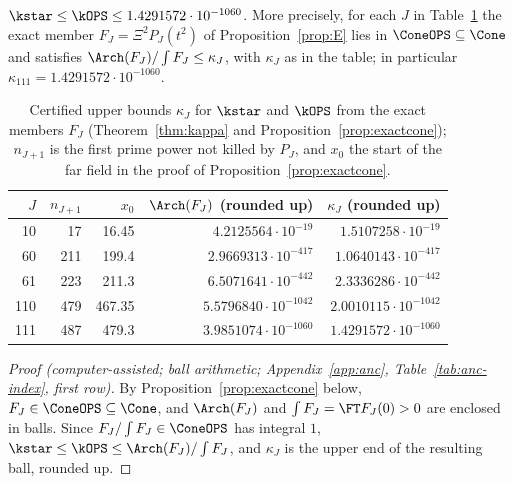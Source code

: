 \begin{theorem}\label{thm:kappa}
$\kstar\le\kOPS\le1.4291572\cdot10^{-1060}$. More precisely, for each $J$ in Table~\ref{tab:kappa-ladder} the exact member
$F_J=\Xi^2P_J(t^2)$ of Proposition~\ref{prop:E} lies in $\ConeOPS\subseteq\Cone$ and satisfies $\Arch(F_J)/\int F_J\le\kappa_J$, with
$\kappa_J$ as in the table; in particular $\kappa_{111}=1.4291572\cdot10^{-1060}$.
\end{theorem}

\begin{table}[ht]
\centering
\caption{Certified upper bounds $\kappa_J$ for $\kstar$ and $\kOPS$ from the exact members $F_J$ (Theorem~\ref{thm:kappa} and
Proposition~\ref{prop:exactcone}); $n_{J+1}$ is the first prime power not killed by $P_J$, and $x_0$ the start of the far field in the proof
of Proposition~\ref{prop:exactcone}.}\label{tab:kappa-ladder}
\begin{tabular}{rrrrr}
\toprule
$J$ & $n_{J+1}$ & $x_0$ & $\Arch(F_J)$ (rounded up) & $\kappa_J$ (rounded up)\\
\midrule
10 & 17 & 16.45 & $4.2125564\cdot10^{-19}$ & $1.5107258\cdot10^{-19}$\\
60 & 211 & 199.4 & $2.9669313\cdot10^{-417}$ & $1.0640143\cdot10^{-417}$\\
61 & 223 & 211.3 & $6.5071641\cdot10^{-442}$ & $2.3336286\cdot10^{-442}$\\
110 & 479 & 467.35 & $5.5796840\cdot10^{-1042}$ & $2.0010115\cdot10^{-1042}$\\
111 & 487 & 479.3 & $3.9851074\cdot10^{-1060}$ & $1.4291572\cdot10^{-1060}$\\
\bottomrule
\end{tabular}
\end{table}

\begin{proof}[Proof (computer-assisted; ball arithmetic; Appendix~\ref{app:anc}, Table~\ref{tab:anc-index}, first row)]
By Proposition~\ref{prop:exactcone} below, $F_J\in\ConeOPS\subseteq\Cone$, and $\Arch(F_J)$ and $\int F_J=\FT F_J(0)>0$ are enclosed in balls.
Since $F_J/\int F_J\in\ConeOPS$ has integral $1$, $\kstar\le\kOPS\le\Arch(F_J)/\int F_J$, and $\kappa_J$ is the upper end of the resulting
ball, rounded up.
\end{proof}

